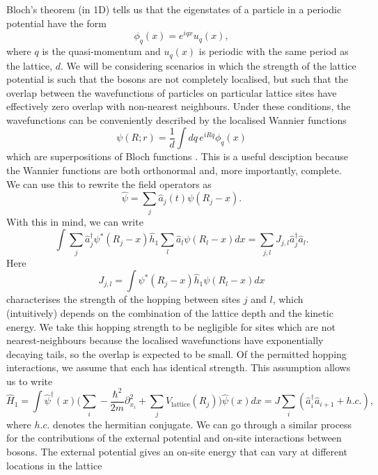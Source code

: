 \documentclass[a4paper,10pt]{article}
\begin{document}
Bloch's theorem (in 1D) \cite{Bloch1929,Kittel1987} tells us that the eigenstates of a particle in a periodic potential have the form
\begin{equation}
 \phi_q(x)=e^{iqx}u_{q}(x),
\end{equation}
where $q$ is the quasi-momentum and $u_q(x)$ is periodic with the same period as the lattice, $d$. We will be considering scenarios in which the strength of the lattice potential
is such that the bosons are not completely localised, but such that the overlap between the wavefunctions of particles on particular lattice sites have effectively zero overlap 
with non-nearest neighbours. Under these conditions, the wavefunctions can be conveniently described by the localised Wannier functions
\begin{equation}
\psi(R;r)=\frac{1}{d}\int dq\, e^{iRq}\phi_q(x)
\end{equation}
which are superpositions of Bloch functions \cite{Kittel1987,Wannier1937}. This is a useful desciption because the Wannier functions are both orthonormal and, more importantly, complete.
We can use this to rewrite the field operators as 
\begin{equation}
\label{field_operators_wannier}
 \hat{\psi}=\sum_j \hat{a}_{j}(t)\psi(R_j-x).
\end{equation}
With this in mind, we can write
\begin{equation}
 \int  \sum_j\hat{a}_j^{\dagger}\psi^{*}(R_j-x) \hat{h}_1  \sum_l  \hat{a}_l\psi(R_l-x)dx=\sum_{j,l} J_{j,l}\hat{a}_{j}^{\dagger}\hat{a}_l.
\end{equation}
Here
\begin{equation}
 J_{j,l}=\int  \psi^{*}(R_j-x) \hat{h}_1  \psi(R_l-x)dx
\end{equation}
characterises the strength of the hopping between sites $j$ and $l$, which (intuitively) depends on the combination of the lattice depth and the kinetic energy. We take this hopping strength to be negligible
for sites which are not nearest-neighbours because the localised wavefunctions have exponentially decaying tails, so the overlap is expected to be small. Of the permitted hopping interactions, we assume 
that each has identical strength. This assumption allows us to write
\begin{equation}
 \hat{H}_1=\int  \hat{\psi}^{\dagger}(x) \bigg(  \sum_{i}-\frac{\hbar^{2}}{2m}  \partial_{x_{i}}^2+\sum_{j}V_{\text{lattice}}(R_{j})  \bigg)    \hat{\psi}(x)dx=J\sum_{i}(\hat{a}^\dagger_{i}\hat{a}_{i+1}+h.c.),
\end{equation}
where $h.c.$ denotes the hermitian conjugate.
We can go through a similar process for the contributions of the external potential and on-site interactions between bosons. The external potential gives an on-site energy that can vary
at different locations in the lattice
\end{document}

